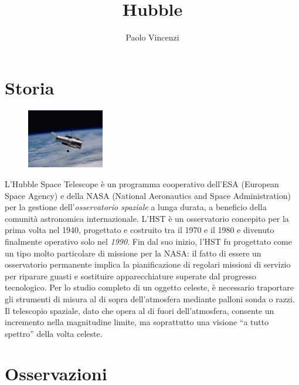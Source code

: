 \documentclass[12pt,a4paper]{article}
\begin{document}
\title{\vspace{-70pt}Hubble}
\author{Paolo Vincenzi}
\date{}
\maketitle
\pagestyle{empty}
\thispagestyle{empty}

\section*{Storia}
\label{storia}
\begin{figure}
  \vspace{-10pt}
  \begin{center}
    \includegraphics[width=0.30\textwidth]{satellite}
  \end{center}
  \vspace{-20pt}
\end{figure}
L'Hubble Space Telescope è un programma cooperativo dell'ESA (European Space Agency) e della NASA (National Aeronautics and Space Administration) per la gestione dell'\emph{osservatorio spaziale} a lunga durata, a beneficio della comunità astronomica internazionale. L'HST è un osservatorio concepito per la prima volta nel 1940, progettato e costruito tra il 1970 e il 1980 e divenuto finalmente operativo solo nel \emph{1990}. Fin dal suo inizio, l'HST fu progettato come un tipo molto particolare di missione per la NASA: il fatto di essere un osservatorio permanente implica la pianificazione di regolari missioni di servizio per riparare guasti e sostituire apparecchiature superate dal progresso tecnologico.
Per lo studio completo di un oggetto celeste, è necessario traportare gli strumenti di misura al di sopra dell'atmosfera mediante palloni sonda o razzi.
Il telescopio spaziale, dato che opera al di fuori dell'atmosfera, consente un incremento nella magnitudine limite, ma soprattutto una visione ``a tutto spettro'' della volta celeste.

\section*{Osservazioni}
\label{osservazioni}
\end{document}

